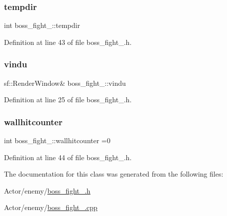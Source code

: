 \subsubsection{\texorpdfstring{tempdir}{tempdir}}
{\footnotesize\ttfamily int boss\+\_\+fight\+\_\+::tempdir}



Definition at line 43 of file boss\+\_\+fight\+\_.\+h.

\hypertarget{classboss__fight__3_a04f218c9ae59c20b06c5bc19a49ce391}{}\label{classboss__fight__3_a04f218c9ae59c20b06c5bc19a49ce391} 
\subsubsection{\texorpdfstring{vindu}{vindu}}
{\footnotesize\ttfamily sf\+::\+Render\+Window\& boss\+\_\+fight\+\_\+::vindu}



Definition at line 25 of file boss\+\_\+fight\+\_.\+h.

\hypertarget{classboss__fight__3_a5db42320e3221354945d930dfac3a7fa}{}\label{classboss__fight__3_a5db42320e3221354945d930dfac3a7fa} 
\subsubsection{\texorpdfstring{wallhitcounter}{wallhitcounter}}
{\footnotesize\ttfamily int boss\+\_\+fight\+\_\+::wallhitcounter =0}



Definition at line 44 of file boss\+\_\+fight\+\_.\+h.



The documentation for this class was generated from the following files\+:\begin{DoxyCompactItemize}
\item 
Actor/enemy/\hyperlink{boss__fight__3_8h}{boss\+\_\+fight\+\_.\+h}\item 
Actor/enemy/\hyperlink{boss__fight__3_8cpp}{boss\+\_\+fight\+\_.\+cpp}\end{DoxyCompactItemize}
